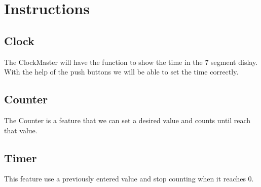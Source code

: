 \section{Instructions}
\label{sec:isa}

\subsection{Clock}

The ClockMaster will have the function to show the time in the 7 segment dislay. With the help of the push buttons we will be able to set the time correctly.

\subsection{Counter}

The Counter is a feature that we can set a desired value  and counts until reach that value.

\subsection{Timer}

This feature use a previously entered value and stop counting when it reaches 0.

